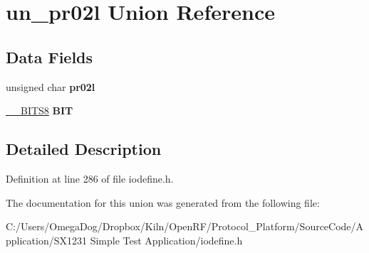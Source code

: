 \hypertarget{unionun__pr02l}{\section{un\-\_\-pr02l Union Reference}
\label{unionun__pr02l}
}
\subsection*{Data Fields}
\begin{DoxyCompactItemize}
\item 
\hypertarget{unionun__pr02l_a5fb06afea58111b152cbf5699ada5e22}{unsigned char {\bfseries pr02l}}\label{unionun__pr02l_a5fb06afea58111b152cbf5699ada5e22}

\item 
\hypertarget{unionun__pr02l_ac1a5e74f96a07c409aa68b8ea3475490}{\hyperlink{struct_____b_i_t_s8}{\-\_\-\-\_\-\-B\-I\-T\-S8} {\bfseries B\-I\-T}}\label{unionun__pr02l_ac1a5e74f96a07c409aa68b8ea3475490}

\end{DoxyCompactItemize}


\subsection{Detailed Description}


Definition at line 286 of file iodefine.\-h.



The documentation for this union was generated from the following file\-:\begin{DoxyCompactItemize}
\item 
C\-:/\-Users/\-Omega\-Dog/\-Dropbox/\-Kiln/\-Open\-R\-F/\-Protocol\-\_\-\-Platform/\-Source\-Code/\-Application/\-S\-X1231 Simple Test Application/iodefine.\-h\end{DoxyCompactItemize}
